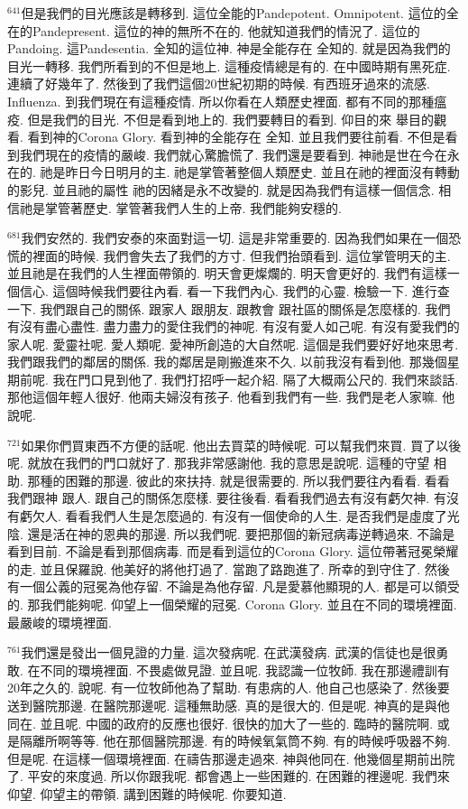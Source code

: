 \documentclass{book}
\begin{document}
$^{641}$但是我們的目光應該是轉移到.
這位全能的Pandepotent.
Omnipotent.
這位的全在的Pandepresent.
這位的神的無所不在的.
他就知道我們的情況了.
這位的Pandoing.
這Pandesentia.
全知的這位神.
神是全能存在 全知的.
就是因為我們的目光一轉移.
我們所看到的不但是地上.
這種疫情總是有的.
在中國時期有黑死症.
連續了好幾年了.
然後到了我們這個20世紀初期的時候.
有西班牙過來的流感.
Influenza.
到我們現在有這種疫情.
所以你看在人類歷史裡面.
都有不同的那種瘟疫.
但是我們的目光.
不但是看到地上的.
我們要轉目的看到.
仰目的來 舉目的觀看.
看到神的Corona Glory.
看到神的全能存在 全知.
並且我們要往前看.
不但是看到我們現在的疫情的嚴峻.
我們就心驚膽慌了.
我們還是要看到.
神祂是世在今在永在的.
祂是昨日今日明月的主.
祂是掌管著整個人類歷史.
並且在祂的裡面沒有轉動的影兒.
並且祂的屬性 祂的因緒是永不改變的.
就是因為我們有這樣一個信念.
相信祂是掌管著歷史.
掌管著我們人生的上帝.
我們能夠安穩的.

$^{681}$我們安然的.
我們安泰的來面對這一切.
這是非常重要的.
因為我們如果在一個恐慌的裡面的時候.
我們會失去了我們的方寸.
但我們抬頭看到.
這位掌管明天的主.
並且祂是在我們的人生裡面帶領的.
明天會更燦爛的.
明天會更好的.
我們有這樣一個信心.
這個時候我們要往內看.
看一下我們內心.
我們的心靈.
檢驗一下.
進行查一下.
我們跟自己的關係.
跟家人 跟朋友.
跟教會 跟社區的關係是怎麼樣的.
我們有沒有盡心盡性.
盡力盡力的愛住我們的神呢.
有沒有愛人如己呢.
有沒有愛我們的家人呢.
愛靈社呢.
愛人類呢.
愛神所創造的大自然呢.
這個是我們要好好地來思考.
我們跟我們的鄰居的關係.
我的鄰居是剛搬進來不久.
以前我沒有看到他.
那幾個星期前呢.
我在門口見到他了.
我們打招呼一起介紹.
隔了大概兩公尺的.
我們來談話.
那他這個年輕人很好.
他兩夫婦沒有孩子.
他看到我們有一些.
我們是老人家嘛.
他說呢.

$^{721}$如果你們買東西不方便的話呢.
他出去買菜的時候呢.
可以幫我們來買.
買了以後呢.
就放在我們的門口就好了.
那我非常感謝他.
我的意思是說呢.
這種的守望 相助.
那種的困難的那邊.
彼此的來扶持.
就是很需要的.
所以我們要往內看看.
看看我們跟神 跟人.
跟自己的關係怎麼樣.
要往後看.
看看我們過去有沒有虧欠神.
有沒有虧欠人.
看看我們人生是怎麼過的.
有沒有一個使命的人生.
是否我們是虛度了光陰.
還是活在神的恩典的那邊.
所以我們呢.
要把那個的新冠病毒逆轉過來.
不論是看到目前.
不論是看到那個病毒.
而是看到這位的Corona Glory.
這位帶著冠冕榮耀的走.
並且保羅說.
他美好的將他打過了.
當跑了路跑進了.
所幸的到守住了.
然後有一個公義的冠冕為他存留.
不論是為他存留.
凡是愛慕他顯現的人.
都是可以領受的.
那我們能夠呢.
仰望上一個榮耀的冠冕.
Corona Glory.
並且在不同的環境裡面.
最嚴峻的環境裡面.

$^{761}$我們還是發出一個見證的力量.
這次發病呢.
在武漢發病.
武漢的信徒也是很勇敢.
在不同的環境裡面.
不畏處做見證.
並且呢.
我認識一位牧師.
我在那邊禮訓有20年之久的.
說呢.
有一位牧師他為了幫助.
有患病的人.
他自己也感染了.
然後要送到醫院那邊.
在醫院那邊呢.
這種無助感.
真的是很大的.
但是呢.
神真的是與他同在.
並且呢.
中國的政府的反應也很好.
很快的加大了一些的.
臨時的醫院啊.
或是隔離所啊等等.
他在那個醫院那邊.
有的時候氧氣筒不夠.
有的時候呼吸器不夠.
但是呢.
在這樣一個環境裡面.
在禱告那邊走過來.
神與他同在.
他幾個星期前出院了.
平安的來度過.
所以你跟我呢.
都會遇上一些困難的.
在困難的裡邊呢.
我們來仰望.
仰望主的帶領.
講到困難的時候呢.
你要知道.
\end{document}
